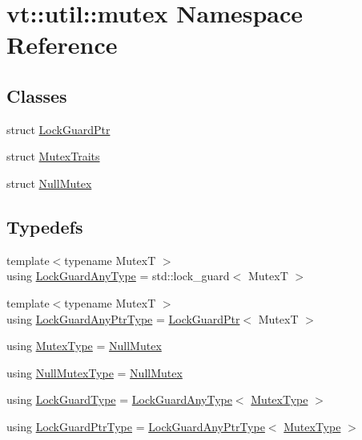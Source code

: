 \hypertarget{namespacevt_1_1util_1_1mutex}{}\section{vt\+:\+:util\+:\+:mutex Namespace Reference}
\label{namespacevt_1_1util_1_1mutex}
\subsection*{Classes}
\begin{DoxyCompactItemize}
\item 
struct \hyperlink{structvt_1_1util_1_1mutex_1_1_lock_guard_ptr}{Lock\+Guard\+Ptr}
\item 
struct \hyperlink{structvt_1_1util_1_1mutex_1_1_mutex_traits}{Mutex\+Traits}
\item 
struct \hyperlink{structvt_1_1util_1_1mutex_1_1_null_mutex}{Null\+Mutex}
\end{DoxyCompactItemize}
\subsection*{Typedefs}
\begin{DoxyCompactItemize}
\item 
{\footnotesize template$<$typename MutexT $>$ }\\using \hyperlink{namespacevt_1_1util_1_1mutex_ae88ee37c8846b0738a5137f96f912394}{Lock\+Guard\+Any\+Type} = std\+::lock\+\_\+guard$<$ MutexT $>$
\item 
{\footnotesize template$<$typename MutexT $>$ }\\using \hyperlink{namespacevt_1_1util_1_1mutex_ab8d2986992b726eed741bcae3bf9a789}{Lock\+Guard\+Any\+Ptr\+Type} = \hyperlink{structvt_1_1util_1_1mutex_1_1_lock_guard_ptr}{Lock\+Guard\+Ptr}$<$ MutexT $>$
\item 
using \hyperlink{namespacevt_1_1util_1_1mutex_a891571f52e1bcf9eca62d0c2d0862a17}{Mutex\+Type} = \hyperlink{structvt_1_1util_1_1mutex_1_1_null_mutex}{Null\+Mutex}
\item 
using \hyperlink{namespacevt_1_1util_1_1mutex_a92b4648d6c680ec378e4f36ac5af414a}{Null\+Mutex\+Type} = \hyperlink{structvt_1_1util_1_1mutex_1_1_null_mutex}{Null\+Mutex}
\item 
using \hyperlink{namespacevt_1_1util_1_1mutex_a06a2c6944076fefe1b753e8eff4c58bd}{Lock\+Guard\+Type} = \hyperlink{namespacevt_1_1util_1_1mutex_ae88ee37c8846b0738a5137f96f912394}{Lock\+Guard\+Any\+Type}$<$ \hyperlink{namespacevt_1_1util_1_1mutex_a891571f52e1bcf9eca62d0c2d0862a17}{Mutex\+Type} $>$
\item 
using \hyperlink{namespacevt_1_1util_1_1mutex_aca2c02dfb2d46edf4fc867f9ce64d0e5}{Lock\+Guard\+Ptr\+Type} = \hyperlink{namespacevt_1_1util_1_1mutex_ab8d2986992b726eed741bcae3bf9a789}{Lock\+Guard\+Any\+Ptr\+Type}$<$ \hyperlink{namespacevt_1_1util_1_1mutex_a891571f52e1bcf9eca62d0c2d0862a17}{Mutex\+Type} $>$
\end{DoxyCompactItemize}


